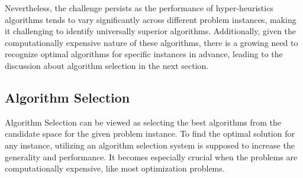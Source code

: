 \documentclass[preprint,review,12pt]{elsarticle}
\begin{document}
Nevertheless, the challenge persists as the performance of hyper-heuristics algorithms tends to vary significantly across different problem instances, making it challenging to identify universally superior algorithms. Additionally, given the computationally expensive nature of these algorithms, there is a growing need to recognize optimal algorithms for specific instances in advance, leading to the discussion about algorithm selection in the next section. 

\subsection{Algorithm Selection}
Algorithm Selection can be viewed as selecting the best algorithms from the candidate space for the given problem instance.  To find the optimal solution for any instance, utilizing an algorithm selection system is supposed to increase the generality and performance. It becomes especially crucial when the problems are computationally expensive, like most optimization problems.
\end{document}
